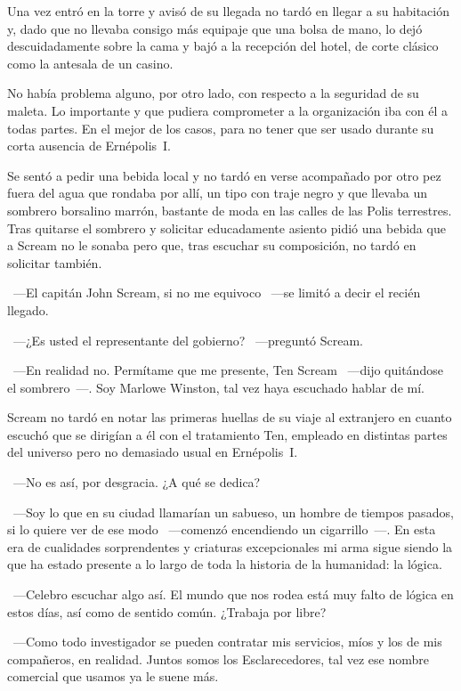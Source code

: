 Una vez entró en la torre y avisó de su llegada no tardó en llegar a su habitación y, dado que no llevaba consigo más equipaje que una bolsa de mano, lo dejó descuidadamente sobre la cama y bajó a la recepción del hotel, de corte clásico como la antesala de un casino.

No había problema alguno, por otro lado, con respecto a la seguridad de su maleta. Lo importante y que pudiera comprometer a la organización iba con él a todas partes. En el mejor de los casos, para no tener que ser usado durante su corta ausencia de Ernépolis~I.

Se sentó a pedir una bebida local y no tardó en verse acompañado por otro pez fuera del agua que rondaba por allí, un tipo con traje negro y que llevaba un sombrero borsalino marrón, bastante de moda en las calles de las Polis terrestres. Tras quitarse el sombrero y solicitar educadamente asiento pidió una bebida que a Scream no le sonaba pero que, tras escuchar su composición, no tardó en solicitar también.

~---El capitán John Scream, si no me equivoco ~---se limitó a decir el recién llegado.

~---¿Es usted el representante del gobierno? ~---preguntó Scream.

~---En realidad no. Permítame que me presente, Ten Scream ~---dijo quitándose el sombrero~---. Soy Marlowe Winston, tal vez haya escuchado hablar de mí.

Scream no tardó en notar las primeras huellas de su viaje al extranjero en cuanto escuchó que se dirigían a él con el tratamiento Ten, empleado en distintas partes del universo pero no demasiado usual en Ernépolis~I.

~---No es así, por desgracia. ¿A qué se dedica?

~---Soy lo que en su ciudad llamarían un sabueso, un hombre de tiempos pasados, si lo quiere ver de ese modo ~---comenzó encendiendo un cigarrillo~---. En esta era de cualidades sorprendentes y criaturas excepcionales mi arma sigue siendo la que ha estado presente a lo largo de toda la historia de la humanidad: la lógica.

~---Celebro escuchar algo así. El mundo que nos rodea está muy falto de lógica en estos días, así como de sentido común. ¿Trabaja por libre?

~---Como todo investigador se pueden contratar mis servicios, míos y los de mis compañeros, en realidad. Juntos somos los Esclarecedores, tal vez ese nombre comercial que usamos ya le suene más.


